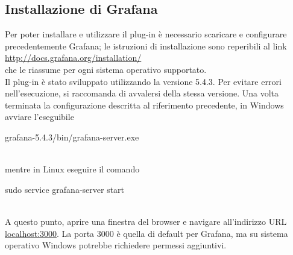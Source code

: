\subsection{Installazione di Grafana}
Per poter installare e utilizzare il plug-in è necessario scaricare e configurare precedentemente Grafana; le istruzioni di installazione sono reperibili al link\\[0.2cm]
\hspace*{10mm}\url{http://docs.grafana.org/installation/} \\[0.2cm]
che le riassume per ogni sistema operativo supportato.\\
Il plug-in è stato sviluppato utilizzando la versione 5.4.3. Per evitare errori nell'esecuzione, si raccomanda di avvalersi della stessa versione.
Una volta terminata la configurazione descritta al riferimento precedente, in Windows avviare l'eseguibile\\[0.2cm]
\hspace*{10mm}\begin{ttfamily}grafana-5.4.3/bin/grafana-server.exe\end{ttfamily}\\[0.2cm] mentre in Linux eseguire il comando\\[0.2cm]
\hspace*{10mm}\begin{ttfamily}sudo service grafana-server start\end{ttfamily}\\[0.2cm]
A questo punto, aprire una finestra del browser e navigare all'indirizzo URL \url{localhost:3000}. La porta 3000 è quella di default per Grafana, ma su sistema operativo Windows potrebbe richiedere permessi aggiuntivi.
